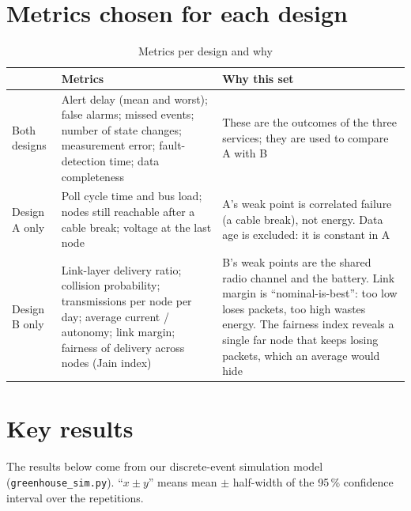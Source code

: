\documentclass[11pt,a4paper]{report}
\begin{document}
\section{Metrics chosen for each design}
\begin{table}[htbp]
\centering
\caption{Metrics per design and why}\label{tab:metrics}
\small
\begin{tabularx}{\textwidth}{>{\raggedright\arraybackslash}p{2.2cm} Y Y}
\toprule
& \textbf{Metrics} & \textbf{Why this set}\\
\midrule
Both designs & Alert delay (mean and worst); false alarms; missed events; number of state changes; measurement error; fault-detection time; data completeness & These are the outcomes of the three services; they are used to compare A with B\\
Design A only & Poll cycle time and bus load; nodes still reachable after a cable break; voltage at the last node & A's weak point is correlated failure (a cable break), not energy. Data age is excluded: it is constant in A\\
Design B only & Link-layer delivery ratio; collision probability; transmissions per node per day; average current / autonomy; link margin; fairness of delivery across nodes (Jain index) & B's weak points are the shared radio channel and the battery. Link margin is ``nominal-is-best'': too low loses packets, too high wastes energy. The fairness index reveals a single far node that keeps losing packets, which an average would hide\\
\bottomrule
\end{tabularx}
\end{table}

\section{Key results}
The results below come from our discrete-event simulation model (\texttt{greenhouse\_sim.py}). ``$x \pm y$'' means mean $\pm$ half-width of the 95\,\% confidence interval over the repetitions.
\end{document}
